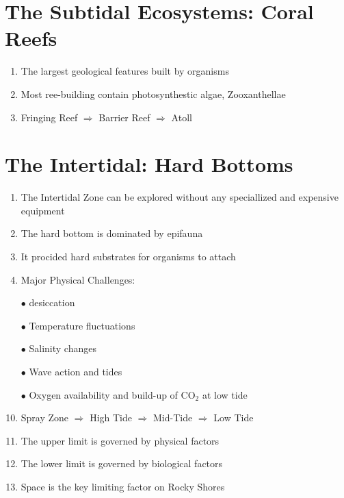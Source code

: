 \documentclass{report}
\begin{document}
\section{The Subtidal Ecosystems: Coral Reefs}
\begin{enumerate}
    \item The largest geological features built by organisms 
    \item Most ree-building contain photosynthestic algae, Zooxanthellae 
    \item Fringing Reef $\Rightarrow$ Barrier Reef $\Rightarrow$ Atoll
\end{enumerate}


\section{The Intertidal: Hard Bottoms}
\begin{enumerate}
    \item The Intertidal Zone can be explored without any speciallized and expensive equipment
    \item The hard bottom is dominated by epifauna
    \item It procided hard substrates for organisms to attach  
    \item Major Physical Challenges:
    \item [$\bullet$]desiccation
    \item [$\bullet$]Temperature fluctuations 
    \item [$\bullet$]Salinity changes 
    \item [$\bullet$]Wave action and tides 
    \item [$\bullet$]Oxygen availability and build-up of CO$_{2}$ at low tide 
    \item Spray Zone $\Rightarrow$ High Tide $\Rightarrow$ Mid-Tide $\Rightarrow$ Low Tide 
    \item The upper limit is governed by physical factors
    \item The lower limit is governed by biological factors 
    \item Space is the key limiting factor on Rocky Shores 
\end{enumerate}
\end{document}
